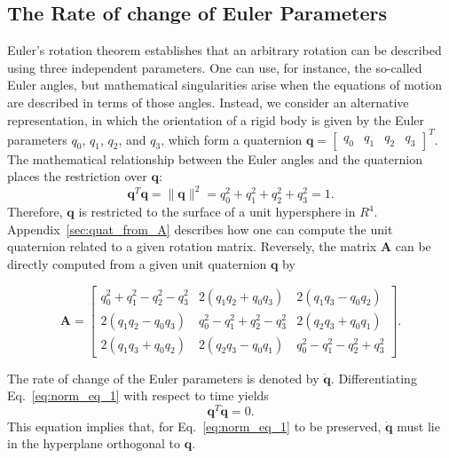 \documentclass[aip,jcp,reprint,amsmath,amssymb]{revtex4-1}
\newcommand{\mt}[1]{\boldsymbol{\mathbf{#1}}}           %
\newcommand{\vt}[1]{\boldsymbol{\mathbf{#1}}}           %
\newcommand{\tr}[1]{#1^T}                               %
\begin{document}
\subsection{The Rate of change of Euler Parameters}
\label{sec:eulerparameters}

Euler's rotation theorem establishes that an arbitrary rotation can be described using three independent parameters. One can use, for instance, the so-called Euler angles, but mathematical singularities arise when the equations of motion are described in terms of those angles. Instead, we consider an alternative representation, in which the orientation of a rigid body is given by the Euler parameters $q_0$, $q_1$, $q_2$, and $q_3$, which form a quaternion $\vt q = \tr {[\begin{array}{cccc} q_0 & q_1 & q_2 & q_3 \end{array}]}$. The mathematical relationship between the Euler angles and the quaternion places the restriction over $\boldsymbol{q}$:\cite{Goldstein2002}
\begin{equation}
\label{eq:norm_eq_1}
\tr{\vt q}{\vt q} = \|\vt q\|^2 = q_0^2 + q_1^2 + q_2^2 + q_3^2 = 1.
\end{equation}
Therefore, $\vt q$ is restricted to the surface of a unit hypersphere in $R^4$. Appendix~\ref{sec:quat_from_A} describes how one can compute the unit quaternion related to a given rotation matrix. Reversely, the matrix $\mt A$ can be directly computed from a given unit quaternion $\vt q$ by\cite{Allen1989,Miller2002}
\begin{widetext}
\begin{equation}
\label{eq:A_from_q}
\mt A = \left[ \begin{array}{ccc}
q_0^2 + q_1^2 - q_2^2 - q_3^2 & 2(q_1 q_2 + q_0 q_3) & 2(q_1 q_3 - q_0 q_2) \\
2(q_1 q_2 - q_0 q_3) & q_0^2 - q_1^2 + q_2^2 - q_3^2 & 2(q_2 q_3 + q_0 q_1) \\
2(q_1 q_3 + q_0 q_2) & 2(q_2 q_3 - q_0 q_1) & q_0^2 - q_1^2 - q_2^2 + q_3^2  
\end{array} \right].
\end{equation}
\end{widetext}

The rate of change of the Euler parameters is denoted by $\dot{\vt q}$. Differentiating Eq.~\ref{eq:norm_eq_1} with respect to time yields
\begin{equation}
\label{eq:diff_qTq}
\tr{\vt q}\dot{\vt q} = 0.
\end{equation}
This equation implies that, for Eq.~\ref{eq:norm_eq_1} to be preserved, $\dot{\vt q}$ must lie in the hyperplane orthogonal to $\vt q$.
\end{document}
